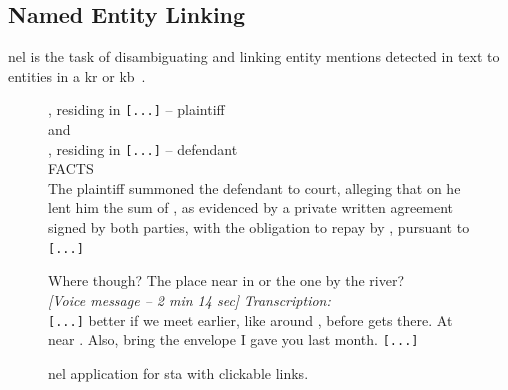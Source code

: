 \subsection{Named Entity Linking}
\begin{definition}
    \Acf{nel} is the task of disambiguating and linking entity mentions detected in text to entities in a \acf{kr} or \ac{kb}~\cite{entityorientedsearch2018balog,jr3}.
\end{definition}

\begin{figure}[htbp]
\centering
\begin{minipage}[t]{0.48\linewidth}
\small
{}
, residing in  \texttt{[...]} -- plaintiff\\
and\\
, residing in  \texttt{[...]} -- defendant\\
FACTS\\
The plaintiff summoned the defendant to court, alleging that on  he lent him the sum of , as evidenced by a private written agreement signed by both parties, with the obligation to repay by , pursuant to  \texttt{[...]}
\label{fig:extract-nel-judgment}
\end{minipage}
\hfill
\begin{minipage}[t]{0.48\linewidth}
\small
\NELDate{[2025-07-28 -- 14:15]}  Where though? The place near  in  or the one by the river?\\
\NELDate{[2025-07-29 -- 08:45]}  \textit{[Voice message -- 2 min 14 sec]}
\quad \textit{Transcription:}\\
\quad \texttt{[...]} better if we meet earlier, like around , before  gets there. At  near . Also, bring the envelope I gave you last month.  \texttt{[...]}\\
\label{fig:extract-nel-chat-logs}
\end{minipage}
\caption{\Ac{nel} application for \acl{sta} with clickable links.}
\label{fig:extracts-nel-new}
\end{figure}

